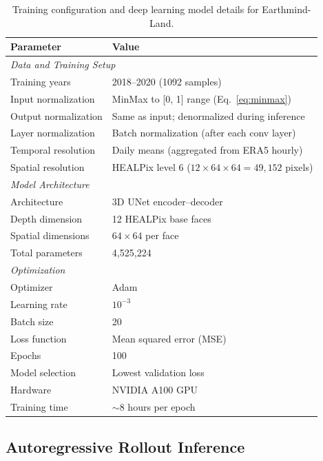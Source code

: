\documentclass[11pt]{article}
\begin{document}
\begin{table}[htbp]
\centering
\caption{Training configuration and deep learning model details for Earthmind-Land.}
\label{tab:training}
\small
\begin{tabular}{@{}ll@{}}
\toprule
\textbf{Parameter} & \textbf{Value} \\
\midrule
\multicolumn{2}{l}{\textit{Data and Training Setup}} \\
Training years & 2018--2020 (1092 samples) \\
Input normalization & MinMax to [0, 1] range (Eq.~\ref{eq:minmax}) \\
Output normalization & Same as input; denormalized during inference \\
Layer normalization & Batch normalization (after each conv layer) \\
Temporal resolution & Daily means (aggregated from ERA5 hourly) \\
Spatial resolution & HEALPix level 6 ($12 \times 64 \times 64 = 49,152$ pixels) \\
\midrule
\multicolumn{2}{l}{\textit{Model Architecture}} \\
Architecture & 3D UNet encoder--decoder \\
Depth dimension & 12 HEALPix base faces \\
Spatial dimensions & $64 \times 64$ per face \\
Total parameters & 4,525,224 \\
\midrule
\multicolumn{2}{l}{\textit{Optimization}} \\
Optimizer & Adam \\
Learning rate & $10^{-3}$ \\
Batch size & 20 \\
Loss function & Mean squared error (MSE) \\
Epochs & 100 \\
Model selection & Lowest validation loss \\
Hardware & NVIDIA A100 GPU \\
Training time & $\sim$8 hours per epoch \\
\bottomrule
\end{tabular}
\end{table}

\subsection{Autoregressive Rollout Inference}
\label{sec:inference}
\end{document}
